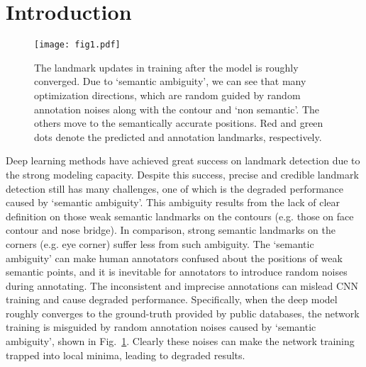 \documentclass[10pt,twocolumn,letterpaper]{article}
\begin{document}
\section{Introduction}





\begin{figure}[t]
	\begin{center}
\texttt{[image: fig1.pdf]}
	\end{center}
	\caption{ {The  landmark updates in training after the model is roughly converged. Due to `semantic ambiguity', we can see that 
			many optimization directions, which are random guided by random annotation noises {along with the contour and 
				`non semantic'.} The others move to the semantically accurate positions. 
Red and green dots denote the predicted and annotation landmarks, respectively.
	}}
	\label{fig:problem}
\end{figure}


Deep learning methods \cite{Sun2013Deep, zhang2016learning, zhu2017face, lv2017deep, feng2017wing, wu2018look} have achieved 
great success on landmark detection due to the strong modeling capacity.
Despite this success, precise and credible landmark detection still has many challenges, one of which  is the degraded performance caused by `semantic ambiguity'. This ambiguity results from the lack of clear definition  on those weak semantic landmarks {on the contours} (e.g. those on face contour and nose bridge). In comparison, strong semantic landmarks on the corners (e.g. eye corner) {suffer less from such 
	ambiguity}. 
The `semantic ambiguity' can make human annotators confused about the positions of weak semantic points, and it is inevitable for annotators to introduce random noises {during annotating}. The inconsistent and imprecise annotations can mislead CNN training and cause degraded performance. 
Specifically, when the deep model roughly converges to the ground-truth provided by public databases, the network training is misguided by random annotation noises caused by `semantic ambiguity', shown in Fig.~\ref{fig:problem}. Clearly these noises can make the network training trapped into local minima, leading to degraded results. 
\end{document}

